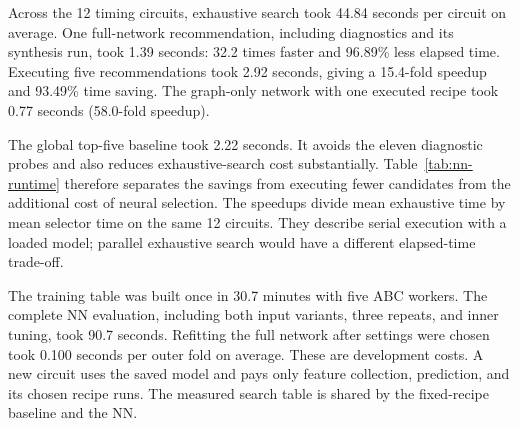Across the 12 timing circuits, exhaustive search took 44.84 seconds per circuit on average. One full-network recommendation, including diagnostics and its synthesis run, took 1.39 seconds: 32.2 times faster and 96.89\% less elapsed time. Executing five recommendations took 2.92 seconds, giving a 15.4-fold speedup and 93.49\% time saving. The graph-only network with one executed recipe took 0.77 seconds (58.0-fold speedup).

The global top-five baseline took 2.22 seconds. It avoids the eleven diagnostic probes and also reduces exhaustive-search cost substantially. Table~\ref{tab:nn-runtime} therefore separates the savings from executing fewer candidates from the additional cost of neural selection. The speedups divide mean exhaustive time by mean selector time on the same 12 circuits. They describe serial execution with a loaded model; parallel exhaustive search would have a different elapsed-time trade-off.

The training table was built once in 30.7 minutes with five ABC workers. The complete NN evaluation, including both input variants, three repeats, and inner tuning, took 90.7 seconds. Refitting the full network after settings were chosen took 0.100 seconds per outer fold on average. These are development costs. A new circuit uses the saved model and pays only feature collection, prediction, and its chosen recipe runs. The measured search table is shared by the fixed-recipe baseline and the NN.
